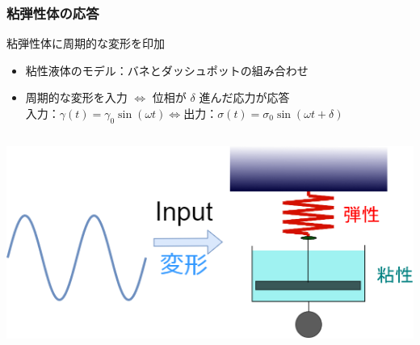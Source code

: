 \documentclass[unicode,12pt]{beamer}%
\begin{document}
\begin{frame}
    \frametitle{粘弾性体の応答}
	\begin{block}{粘弾性体に周期的な変形を印加}
		\begin{itemize}
			\item 粘性液体のモデル：バネとダッシュポットの組み合わせ
			\item 周期的な変形を入力 $\Leftrightarrow$ 位相が $\delta$ 進んだ応力が応答\\
			$\text{入力：}\gamma (t) = \gamma_0 \sin(\omega t) \Leftrightarrow \text{出力：}\sigma(t) = \sigma_0 \sin(\omega t + \delta)$
		\end{itemize}
	\end{block}
	\begin{columns}[c, onlytextwidth]
			\centering
				\includegraphics[width=\textwidth]{dynamic_ViscoElast.png}
			
			\centering
	\end{columns}
\end{frame}
\end{document}
